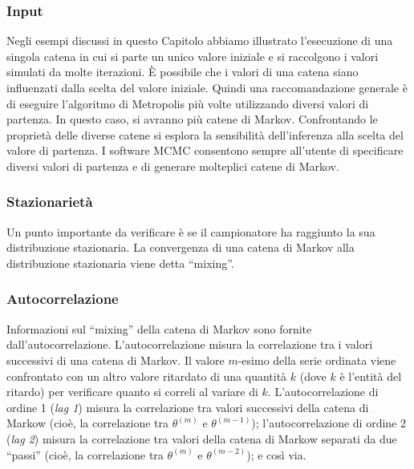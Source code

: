 \documentclass[
  11pt,
]{krantz}
\theoremstyle{definition}
\theoremstyle{definition}
\theoremstyle{definition}
\theoremstyle{definition}
\theoremstyle{remark}
\begin{document}
\hypertarget{input}{%
\subsubsection{Input}\label{input}}

Negli esempi discussi in questo Capitolo abbiamo illustrato l'esecuzione di una singola catena in cui si parte un unico valore iniziale e si raccolgono i valori simulati da molte iterazioni. È possibile che i valori di una catena siano influenzati dalla scelta del valore iniziale. Quindi una raccomandazione generale è di eseguire l'algoritmo di Metropolis più volte utilizzando diversi valori di partenza. In questo caso, si avranno più catene di Markov. Confrontando le proprietà delle diverse catene si esplora la sensibilità dell'inferenza alla scelta del valore di partenza. I software MCMC consentono sempre all'utente di specificare diversi valori di partenza e di generare molteplici catene di Markov.

\hypertarget{stazionarietuxe0}{%
\subsubsection{Stazionarietà}\label{stazionarietuxe0}}

Un punto importante da verificare è se il campionatore ha raggiunto la sua distribuzione stazionaria. La convergenza di una catena di Markov alla distribuzione stazionaria viene detta ``mixing''.

\hypertarget{approx-post-autocor}{%
\subsubsection{Autocorrelazione}\label{approx-post-autocor}}

Informazioni sul ``mixing'' della catena di Markov sono fornite dall'autocorrelazione. L'autocorrelazione misura la correlazione tra i valori successivi di una catena di Markov. Il valore \(m\)-esimo della serie ordinata viene confrontato con un altro valore ritardato di una quantità \(k\) (dove \(k\) è l'entità del ritardo) per verificare quanto si correli al variare di \(k\). L'autocorrelazione di ordine 1 (\emph{lag 1}) misura la correlazione tra valori successivi della catena di Markow (cioè, la correlazione tra \(\theta^{(m)}\) e \(\theta^{(m-1)}\)); l'autocorrelazione di ordine 2 (\emph{lag 2}) misura la correlazione tra valori della catena di Markow separati da due ``passi'' (cioè, la correlazione tra \(\theta^{(m)}\) e \(\theta^{(m-2)}\)); e così via.
\end{document}

